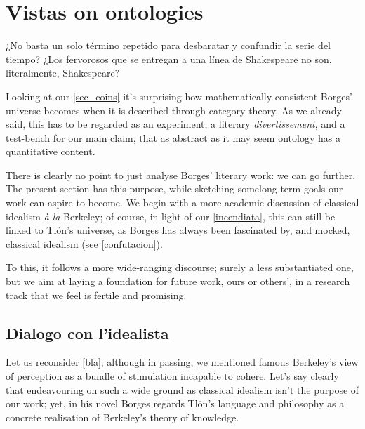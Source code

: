 \section{Vistas on ontologies}
\epigraph{¿No basta un solo término repetido para desbaratar y confundir la serie del tiempo? ¿Los fervorosos que se entregan a una línea de Shakespeare no son, literalmente, Shakespeare?}{\cite{confutacion}}
Looking at our \autoref{sec_coins} it's surprising how mathematically consistent Borges' universe becomes when it is described through category theory. As we already said, this has to be regarded as an experiment, a literary \emph{divertissement}, and a test-bench for our main claim, that as abstract as it may seem ontology has a quantitative content.

There is clearly no point to just analyse Borges' literary work: we can go further. The present section has this purpose, while sketching somelong term goals our work can aspire to become. We begin with a more academic discussion of classical idealism \emph{à la} Berkeley; of course, in light of our \autoref{incendiata}, this can still be linked to Tl\"on's universe, as Borges has always been fascinated by, and mocked, classical idealism (see \autoref{confutacion}).

To this, it follows a more wide-ranging discourse; surely a less substantiated one, but we aim at laying a foundation for future work, ours or others', in a research track that we feel is fertile and promising.
\subsection{Dialogo con l'idealista}\label{berkelei}
Let us reconsider \autoref{bla}; although in passing, we mentioned famous Berkeley's view of perception as a bundle of stimulation incapable to cohere. Let's say clearly that endeavouring on such a wide ground as classical idealism isn't the purpose of our work; yet, in his novel Borges regards Tl\"on's language and philosophy as a concrete realisation of Berkeley's theory of knowledge.

